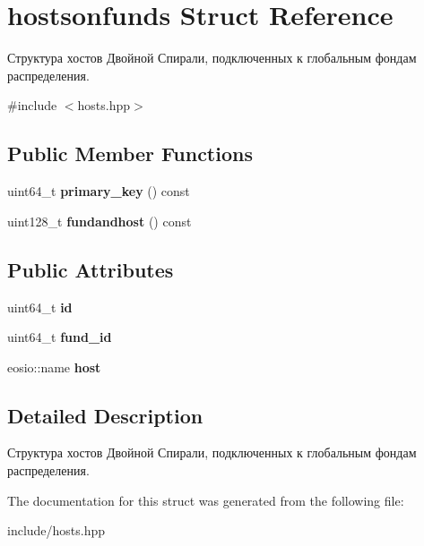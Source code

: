 \hypertarget{structhostsonfunds}{}\section{hostsonfunds Struct Reference}
\label{structhostsonfunds}


Структура хостов Двойной Спирали, подключенных к глобальным фондам распределения.  




{\ttfamily \#include $<$hosts.\+hpp$>$}

\subsection*{Public Member Functions}
\begin{DoxyCompactItemize}
\item 
\mbox{\label{structhostsonfunds_ad215eeef6cec763f1ab292ea6c29112f}} 
uint64\+\_\+t {\bfseries primary\+\_\+key} () const
\item 
\mbox{\label{structhostsonfunds_aa6f6be0c760701a5f38affb00713d253}} 
uint128\+\_\+t {\bfseries fundandhost} () const
\end{DoxyCompactItemize}
\subsection*{Public Attributes}
\begin{DoxyCompactItemize}
\item 
\mbox{\label{structhostsonfunds_ae08cae788f418dbd02d0b3d482cd550e}} 
uint64\+\_\+t {\bfseries id}
\item 
\mbox{\label{structhostsonfunds_aeba4b7f5a7bb81d2d3a43ee7d05c00ed}} 
uint64\+\_\+t {\bfseries fund\+\_\+id}
\item 
\mbox{\label{structhostsonfunds_a9c534a08820e7da9a26ac70ff3b2ee43}} 
eosio\+::name {\bfseries host}
\end{DoxyCompactItemize}


\subsection{Detailed Description}
Структура хостов Двойной Спирали, подключенных к глобальным фондам распределения. 

The documentation for this struct was generated from the following file\+:\begin{DoxyCompactItemize}
\item 
include/hosts.\+hpp\end{DoxyCompactItemize}
